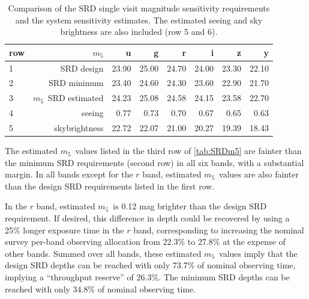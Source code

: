 \documentclass[PST,authoryear,toc]{lsstdoc}
\newcommand{\cm}{\ensuremath{C_m}}
\newcommand{\mf}{\ensuremath{m_5}}
\begin{document}
\begin{table}[ht!]
\caption{Comparison of the SRD single visit magnitude sensitivity requirements and the system sensitivity estimates. The %
 estimated seeing and sky brightness are also included (row 5 and 6).}\label{tab:SRDm5}
\vskip 0.05in
\centering
\begin{tabular}{lrrrrrrr}
\hline    
row & {\mf} &       u &       g &       r &       i &       z &       y \\
\hline
1 & SRD design                 &  23.90 &  25.00 &  24.70 &  24.00 &  23.30 &  22.10 \\
2 & SRD minimum                &  23.40 &  24.60 &  24.30 &  23.60 &  22.90 &  21.70 \\
3 & \mf\ SRD estimated         &  24.23 &  25.08 &  24.58 &  24.15 &  23.58 &  22.70 \\
\hline
4 & seeing                     &   0.77 &   0.73 &   0.70 &   0.67 &   0.65 &   0.63 \\
5 & skybrightness              &  22.72 &  22.07 &  21.00 &  20.27 &  19.39 &  18.43 \\
\hline
\end{tabular}
\end{table}

\FloatBarrier

  
 
 
The estimated \mf\ values listed in the third row of \autoref{tab:SRDm5} are fainter
than the minimum SRD requirements (second row) in all six bands, with a substantial 
margin. In all bands except for the $r$ band, estimated \mf\ values are also fainter
than the design SRD requirements listed in the first row.  

In the $r$ band, estimated \mf\ is 0.12 mag brighter than the design SRD requirement.
If desired, this difference in depth could be recovered by using a 25\% longer exposure 
time in the $r$ band, corresponding to increasing the nominal survey per-band observing
allocation from 22.3\% to 27.8\% at the expense of other bands. Summed over 
all bands, these estimated \mf\ values imply that the design SRD depths can be
reached with only 73.7\% of nominal observing time, implying a ``throughput reserve''
of 26.3\%. The minimum SRD depths can be reached with only 34.8\% of nominal observing time.
\end{document}
